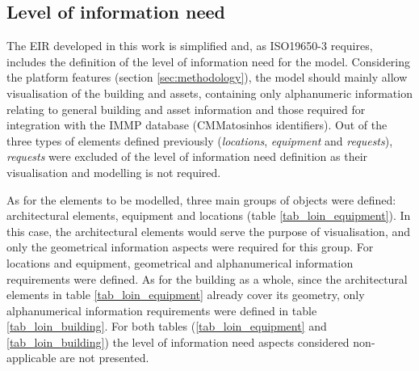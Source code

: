 \documentclass[a4paper, 10pt, twocolumn, twoside]{article}
\begin{document}
\subsection{Level of information need}
\label{subsec:loin}

The EIR developed in this work is simplified and, as ISO19650-3 \cite{19650-3} requires, includes the definition of the level of information need for the model. Considering the platform features (section \ref{sec:methodology}), the model should mainly allow visualisation of the building and assets, containing only alphanumeric information relating to general building and asset information and those required for integration with the IMMP database (CMMatosinhos identifiers). Out of the three types of elements defined previously (\emph{locations}, \emph{equipment} and \emph{requests}), \emph{requests} were excluded of the level of information need definition as their visualisation and modelling is not required.

As for the elements to be modelled, three main groups of objects were defined: architectural elements, equipment and locations (table \ref{tab_loin_equipment}). In this case, the architectural elements would serve the purpose of visualisation, and only the geometrical information aspects were required for this group. For locations and equipment, geometrical and alphanumerical information requirements were defined. As for the building as a whole, since the architectural elements in table \ref{tab_loin_equipment} already cover its geometry, only alphanumerical information requirements were defined in table \ref{tab_loin_building}. For both tables (\ref{tab_loin_equipment} and \ref{tab_loin_building}) the level of information need aspects \cite{17412-1} considered non-applicable are not presented.
\end{document}
